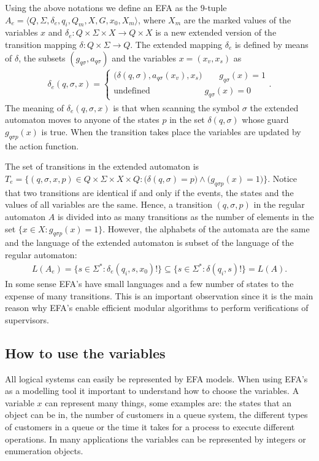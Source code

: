 \documentclass{article}
\begin{document}
Using the above notations we define an EFA as the
$9$-tuple $A_{e}=\langle Q, \Sigma, \delta_{e}, q_i, Q_m, X, G
,x_0, X_m \rangle$, where $X_m$ are the marked values of the
variables $x$ and $\delta_{e}: Q \times \Sigma \times X
\rightarrow Q\times X $ is a new extended version of the
transition mapping $\delta:Q \times \Sigma \rightarrow Q$. The
extended mapping $\delta_e$ is defined by means of
$\delta$, the subsets $(g_{q\sigma},a_{q\sigma})$ and the variables $x=(x_v, x_s)$ as
\begin{eqnarray}
\delta_{e}(q,\sigma,x)=\left\{
\begin{array}{ll}
(\delta(q,\sigma),a_{q \sigma}(x_v),x_s \big)\quad\quad g_{q \sigma}(x)=1\\
\textrm{undefined  } \quad\quad\quad\quad\quad\quad g_{q
\sigma}(x)=0
\end{array}\right..
\end{eqnarray}
The meaning of $\delta_{e}(q,\sigma,x)$ is that when scanning
the symbol $\sigma$ the extended automaton moves to anyone of the
states $p$ in the set $\delta(q,\sigma)$ whose guard $g_{q
\sigma p}(x)$ is true. When the transition takes place the variables are
updated by the action function.

The set of transitions in the extended automaton is
$T_e=\{(q,\sigma,x,p)\in Q \times \Sigma\times X\times Q:
\big(\delta(q,\sigma)=p \big)\wedge \big(g_{q
\sigma p}(x)=1\big)\}$. Notice that two transitions are
identical if and only if the events, the states and the values
of all variables are the same. Hence, a transition $(q,\sigma,p)$ in the
regular automaton $A$ is divided into as many transitions as the number
of elements in the set $\{x\in X:g_{q
\sigma p}(x)=1\}$. However, the
alphabets of the automata are the same and the language of the
extended automaton is subset of the language of the regular automaton:
\begin{eqnarray}
L(A_e)=\{s\in \Sigma^*:
\delta_e(q_i,s,x_0)!\}\subseteq \{s\in \Sigma^*:
\delta(q_i,s)!\}=L(A).
\end{eqnarray}
In some sense EFA's have small languages and a few number of
states to the expense of many transitions. This is an important observation
since it is the main reason why EFA's enable efficient modular algorithms to perform
verifications of supervisors.
\subsection{How to use the variables}
All logical systems can easily be represented by
EFA models. When using EFA's as a modelling tool it important to understand how to choose the variables.
A variable $x$ can represent many things, some examples  are: the states that an object can be in,
 the number of customers in a queue system, the different types of customers in a queue or the time it
takes for a process to execute different operations. In many applications the variables can be represented by
 integers or enumeration objects.
\end{document}
